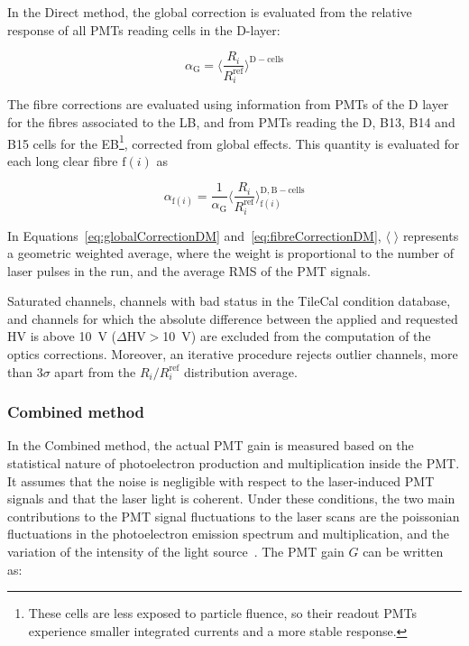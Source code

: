 In the Direct method, the global correction is evaluated from the relative response of all PMTs reading cells in the D-layer:

\begin{equation}
  \alpha_{\mathrm{G}} = \bigg\langle \frac{R_i}{R_i^{\mathrm{ref}}} \bigg\rangle^{\mathrm{D-cells}}
  \label{eq:globalCorrectionDM}
\end{equation}

The fibre corrections are evaluated using information from PMTs of the D layer for the fibres associated to the LB, and from PMTs reading the D, B13, B14 and B15 cells for the EB\footnote{These cells are less exposed to particle fluence, so their readout PMTs experience smaller integrated currents and a more stable response.}, corrected from global effects. This quantity is evaluated for each long clear fibre $\mathrm{f}(i)$ as 

\begin{equation}
  \alpha_{\mathrm{f}(i)} = \frac{1}{\alpha_{\mathrm{G}}} \bigg\langle \frac{R_i}{R_i^{\mathrm{ref}}} \bigg\rangle^{\mathrm{D,B-cells}}_{\mathrm{f}(i)}
  \label{eq:fibreCorrectionDM}
\end{equation}

In Equations~\ref{eq:globalCorrectionDM} and~\ref{eq:fibreCorrectionDM}, $\langle\;\rangle$ represents a geometric weighted average, where the weight is proportional to the number of laser pulses in the run, and the average RMS of the PMT signals.

Saturated channels, channels with bad status in the TileCal condition database, and channels for which the absolute difference between the applied and requested HV is above 
10~V ($\Delta \mathrm{HV}>$10~V) are excluded from the computation of the optics corrections. Moreover, an iterative procedure rejects outlier channels, more than $3\sigma$ apart from the $R_i/R_i^{\mathrm{ref}}$ distribution average.


\subsubsection*{Combined method}

In the Combined method, the actual PMT gain is measured based on the statistical nature of photoelectron production and multiplication inside the PMT. It assumes that the noise is negligible with respect to the laser-induced PMT signals and that the laser light is coherent. Under these conditions, the two main contributions to the PMT signal fluctuations to the laser scans are the poissonian fluctuations in the photoelectron emission spectrum and multiplication, and the variation of the intensity of the light source~\cite{Bures:74}. The PMT gain $G$ can be written as:

